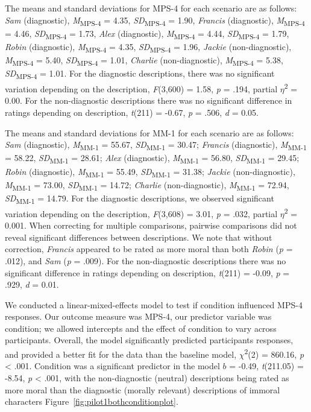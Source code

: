\documentclass[
  english,
  man,floatsintext]{apa7}
\begin{document}
The means and standard deviations for MPS-4 for each scenario are as follows:
\emph{Sam} (diagnostic),
\emph{M}\textsubscript{MPS-4} = 4.35, \emph{SD}\textsubscript{MPS-4} = 1.90,
\emph{Francis} (diagnostic),
\emph{M}\textsubscript{MPS-4} = 4.46, \emph{SD}\textsubscript{MPS-4} = 1.73,
\emph{Alex} (diagnostic),
\emph{M}\textsubscript{MPS-4} = 4.44, \emph{SD}\textsubscript{MPS-4} = 1.79,
\emph{Robin} (diagnostic),
\emph{M}\textsubscript{MPS-4} = 4.35, \emph{SD}\textsubscript{MPS-4} = 1.96,
\emph{Jackie} (non-diagnostic),
\emph{M}\textsubscript{MPS-4} = 5.40, \emph{SD}\textsubscript{MPS-4} = 1.01,
\emph{Charlie} (non-diagnostic),
\emph{M}\textsubscript{MPS-4} = 5.38, \emph{SD}\textsubscript{MPS-4} = 1.01. For the diagnostic descriptions, there was no significant variation depending on the description, \emph{F}(3,600) = 1.58, \emph{p} = .194, partial \(\eta\)\textsuperscript{2} = 0.00. For the non-diagnostic descriptions there was no significant difference in ratings depending on description, \emph{t}(211) = -0.67, \emph{p} = .506, \emph{d} = 0.05.

The means and standard deviations for MM-1 for each scenario are as follows:
\emph{Sam} (diagnostic),
\emph{M}\textsubscript{MM-1} = 55.67, \emph{SD}\textsubscript{MM-1} = 30.47;
\emph{Francis} (diagnostic),
\emph{M}\textsubscript{MM-1} = 58.22, \emph{SD}\textsubscript{MM-1} = 28.61;
\emph{Alex} (diagnostic),
\emph{M}\textsubscript{MM-1} = 56.80, \emph{SD}\textsubscript{MM-1} = 29.45;
\emph{Robin} (diagnostic),
\emph{M}\textsubscript{MM-1} = 55.49, \emph{SD}\textsubscript{MM-1} = 31.38;
\emph{Jackie} (non-diagnostic),
\emph{M}\textsubscript{MM-1} = 73.00, \emph{SD}\textsubscript{MM-1} = 14.72;
\emph{Charlie} (non-diagnostic),
\emph{M}\textsubscript{MM-1} = 72.94, \emph{SD}\textsubscript{MM-1} = 14.79. For the diagnostic descriptions, we observed significant variation depending on the description, \emph{F}(3,608) = 3.01, \emph{p} = .032, partial \(\eta\)\textsuperscript{2} = 0.001. When correcting for multiple comparisons, pairwise comparisons did not reveal significant differences between descriptions. We note that without correction, \emph{Francis} appeared to be rated as more moral than both \emph{Robin} (\emph{p} = .012), and \emph{Sam} (\emph{p} = .009). For the non-diagnostic descriptions there was no significant difference in ratings depending on description, \emph{t}(211) = -0.09, \emph{p} = .929, \emph{d} = 0.01.

We conducted a linear-mixed-effects model to test if condition influenced MPS-4 responses. Our outcome measure was MPS-4, our predictor variable was condition; we allowed intercepts and the effect of condition to vary across participants.
Overall, the model significantly predicted participants responses, and provided a better fit for the data than the baseline model, \(\chi\)\textsuperscript{2}(2) = 860.16, \emph{p} \textless{} .001. Condition was a significant predictor in the model \(b\) = -0.49, \emph{t}(211.05) = -8.54, \emph{p} \textless{} .001, with the non-diagnostic (neutral) descriptions being rated as more moral than the diagnostic (morally relevant) descriptions of immoral characters Figure~\ref{fig:pilot1bothconditionplot}.
\end{document}
